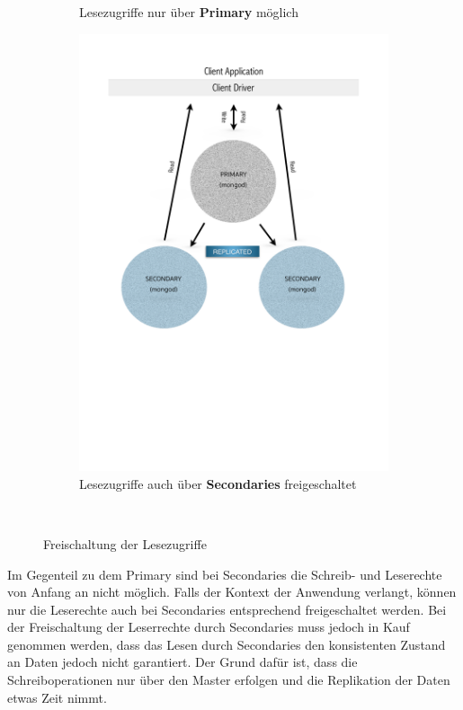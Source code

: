 \begin{figure}[H]
\begin{subfigure}[t]{0.49\textwidth}
	\caption[Lesezugriffe nur über Primary möglich]{Lesezugriffe nur über \textbf{Primary} möglich}
	\label{img:slaveNotOk}
   \end{subfigure}\hfill%
   \begin{subfigure}[t]{0.49\textwidth}\vspace{0pt}
   \centering
	\includegraphics[trim = 0mm 90mm 0mm 20mm, clip, width=1.0\textwidth]{resources/replicaSet/eventualConsistency}
	\caption[Lesezugriffe auch über Secondaries freigeschaltet]{Lesezugriffe auch über \textbf{Secondaries} freigeschaltet}
	\label{img:slaveOk}
   \end{subfigure}\\[5pt]%
   \caption{Freischaltung der Lesezugriffe}
   \label{img:secondariesLowToRead}
\end{figure}
Im Gegenteil zu dem Primary sind bei Secondaries die Schreib- und Leserechte von Anfang an nicht möglich. Falls der Kontext der Anwendung verlangt, können nur die Leserechte auch bei Secondaries entsprechend freigeschaltet werden. Bei der Freischaltung der Leserrechte durch Secondaries muss jedoch in Kauf genommen werden, dass das Lesen durch Secondaries den konsistenten Zustand an Daten jedoch nicht garantiert. Der Grund dafür ist, dass die Schreiboperationen nur über den Master erfolgen und die Replikation der Daten etwas Zeit nimmt.


